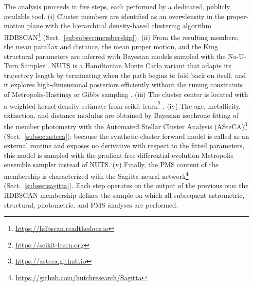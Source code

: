 \documentclass{aa}
\providecommand{\DIFdeltex}[1]{{\protect\color{red}\sout{#1}}} %
\providecommand{\DIFdelbegin}{} %
\providecommand{\DIFdelend}{} %
\providecommand{\DIFdel}[1]{\texorpdfstring{\DIFdeltex{#1}}{}} %
\providecommand{\DIFscaledelfig}{0.5}
\newlength{\DIFdelgraphicswidth} %
\newlength{\DIFdelgraphicsheight} %
\providecommand{\DIFdelincludegraphics}[2][]{%
\sbox{\DIFdelgraphicsbox}{\DIFOincludegraphics[#1]{#2}}%
\settoboxwidth{\DIFdelgraphicswidth}{\DIFdelgraphicsbox} %
\settoboxtotalheight{\DIFdelgraphicsheight}{\DIFdelgraphicsbox} %
\scalebox{\DIFscaledelfig}{%
\parbox[b]{\DIFdelgraphicswidth}{\usebox{\DIFdelgraphicsbox}\\[-\baselineskip] \rule{\DIFdelgraphicswidth}{0em}}\llap{\resizebox{\DIFdelgraphicswidth}{\DIFdelgraphicsheight}{%
\setlength{\unitlength}{\DIFdelgraphicswidth}%
\begin{picture}(1,1)%
\thicklines\linethickness{2pt} %
{\color[rgb]{1,0,0}\put(0,0){\framebox(1,1){}}}%
{\color[rgb]{1,0,0}\put(0,0){\line( 1,1){1}}}%
{\color[rgb]{1,0,0}\put(0,1){\line(1,-1){1}}}%
\end{picture}%
}\hspace*{3pt}}} %
} %
\DeclareRobustCommand{\DIFdelbegin}{\DIFOdelbegin \let\includegraphics\DIFdelincludegraphics} %
\DeclareRobustCommand{\DIFdelend}{\DIFOaddend \let\includegraphics\DIFOincludegraphics} %
\begin{document}
The analysis proceeds in five steps, each performed by a dedicated, publicly available tool\@. (i) Cluster members are identified as an over\DIFdelbegin \DIFdel{-}\DIFdelend density in the proper-motion plane with the hierarchical density-based clustering algorithm HDBSCAN\footnote{\url{https://hdbscan.readthedocs.io}} \citep{10.1007/978-3-642-37456-2_14,McInnes2017} (Sect.~\ref{subsubsec:membership})\@. (ii) From the resulting members, the mean parallax and distance, the mean proper motion, and the King structural parameters are inferred with Bayesian models sampled with the No-U-Turn Sampler \citep[NUTS;][]{2014JMLR...15.1593H}. NUTS is a Hamiltonian Monte Carlo variant that adapts its trajectory length by terminating when the path begins to fold back on itself, and it explores high-dimensional posteriors efficiently without the tuning constraints of Metropolis-Hastings or Gibbs sampling \citep{pymc2023}\@. (iii) The cluster center is located with a weighted kernel density estimate from scikit-learn\footnote{\url{https://scikit-learn.org}} \citep{scikit-learn}\@. (iv) The age, metallicity, extinction, and distance modulus are obtained by Bayesian isochrone fitting of the member photometry with the Automated Stellar Cluster Analysis (ASteCA)\footnote{\url{https://asteca.github.io}} \citep{2015A&A...576A...6P} (Sect.~\ref{subsec:asteca}); because the synthetic-cluster forward model is called as an external routine and exposes no derivative with respect to the fitted parameters, this model is sampled with the gradient-free differential-evolution Metropolis ensemble sampler \citep[DEMetropolis;][]{2006S&C....16..239T} instead of NUTS\@. (v) Finally, the PMS content of the membership is characterized with the Sagitta neural network\footnote{\url{https://github.com/hutchresearch/Sagitta}} \citep{2021AJ....162..282M} (Sect.~\ref{subsec:sagitta}). Each step operates on the output of the previous one: the HDBSCAN membership defines the sample on which all subsequent astrometric, structural, photometric, and PMS analyses are performed.
\end{document}
